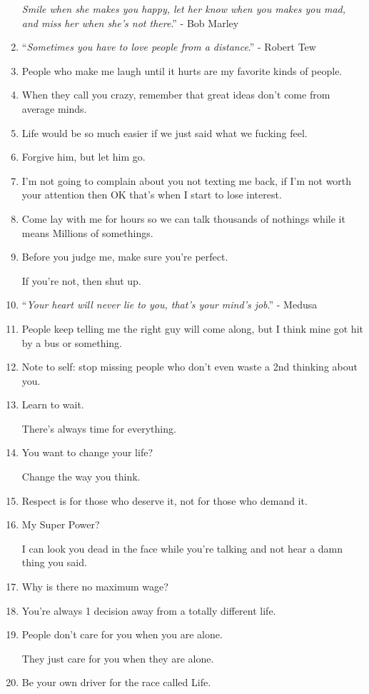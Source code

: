 \documentclass{article}
\begin{document}
\begin{enumerate}
	\textit{Smile when she makes you happy, let her know when you makes you mad, and miss her when she's not there}.'' - Bob Marley
	\item ``\textit{Sometimes you have to love people from a distance}.'' - Robert Tew
	\item People who make me laugh until it hurts are my favorite kinds of people.
	\item When they call you crazy, remember that great ideas don't come from average minds.
	\item Life would be so much easier if we just said what we fucking feel.
	\item Forgive him, but let him go.
	\item I'm not going to complain about you not texting me back, if I'm not worth your attention then OK that's when I start to lose interest.
	\item Come lay with me for hours so we can talk thousands of nothings while it means Millions of somethings.
	\item Before you judge me, make sure you're perfect.
	
	If you're not, then shut up.
	\item ``\textit{Your heart will never lie to you, that's your mind's job}.'' - Medusa
	\item People keep telling me the right guy will come along, but I think mine got hit by a bus or something.
	\item Note to self: stop missing people who don't even waste a 2nd thinking about you.
	\item Learn to wait.
	
	There's always time for everything.
	\item You want to change your life?
	
	Change the way you think.
	\item Respect is for those who deserve it, not for those who demand it.
	\item My Super Power?
	
	I can look you dead in the face while you're talking and not hear a damn thing you said.
	\item Why is there no maximum wage?
	\item You're always 1 decision away from a totally different life.
	\item People don't care for you when you are alone.
	
	They just care for you when they are alone.
	\item Be your own driver for the race called Life.
	

\end{enumerate}
\end{document}
